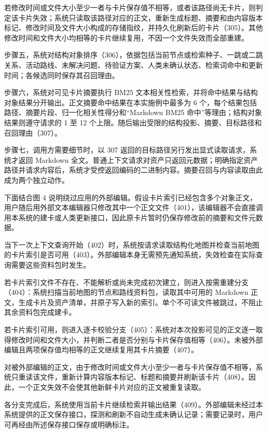  若修改时间或文件大小至少一者与卡片保存值不相等，或者该路径尚无卡片，则判定该卡片失效；系统只读取该路径对应的正文，重新生成标题、摘要和由内容版本标记、修改时间及文件大小构成的存储指纹，并持久化刷新后的卡片（305）。其他修改时间和文件大小均相等的卡片继续复用，不因一个文件失效而全部重建。

 步骤五，系统对结构对象排序（306），依据包括当前节点或检索种子、一跳或二跳关系、活动路线、未解决问题、待验证方案、人类未确认状态、检索词命中和更新时间；各候选同时保存其召回理由。

 步骤六，系统对可见卡片摘要执行 BM25 文本相关性检索，并将命中结果与结构对象结果分开输出。正文摘要命中结果在本实施例中最多为 6 个，每个结果包括路径、摘要片段、归一化相关性得分和“Markdown BM25 命中”等理由；结构对象结果则遵守请求的 1 至 12 个上限。随后输出受限的结构投影、摘要、目标路径和召回理由（307）。

 步骤七，调用方需要细节时，以 307 返回的目标路径另行发出显式读取请求，系统才返回 Markdown 全文。普通上下文请求对资产只返回元数据；明确指定资产路径并请求内容后，系统才受控返回编码的二进制内容。摘要召回与内容读取由此成为两个独立动作。

 下面结合图 4 说明绕过应用的外部编辑。假设卡片索引已经包含多个对象正文，用户随后用外部文本编辑器只修改其中一个正文文件（401），该编辑器不会直接调用本系统的建卡或人类更新接口，因此原卡片暂时仍保存修改前的摘要和文件元数据。

 当下一次上下文查询开始（402）时，系统按请求读取结构化地图并检查当前地图的卡片索引是否可用（403）。外部编辑本身无需预先通知系统，失效检查在实际查询需要这些资料包时发生。

 若卡片索引文件不存在、不能解析或尚未完成初次建立，则进入按需重建分支（404）：系统扫描当前地图的节点和路线资料包，读取其中可用的 Markdown 正文，生成卡片及资产清单，并原子写入新的索引。单个不可读文件被跳过，不阻止其余资料包完成建卡。

 若卡片索引可用，则进入逐卡校验分支（405）：系统对本次投影可见的正文逐一取得修改时间和文件大小，并判断二者是否分别与卡片保存值相等（406）。未被外部编辑且两项保存值均相等的正文继续复用其卡片摘要（407）。

 对被外部编辑的正文，由于修改时间或文件大小至少一者与卡片保存值不相等，系统只重读该文件，重新计算内容版本标记、标题和摘要并刷新该卡片（408）。因此，一个正文失效不会使其他新鲜卡片对应的正文被重复读取。

 各分支完成后，系统使用当前卡片继续检索并输出结果（409）。外部编辑未经过本系统提供的正文保存接口，探测和刷新不自动生成未确认记录；需要记录时，用户可再经由所述保存接口保存或明确标注。

